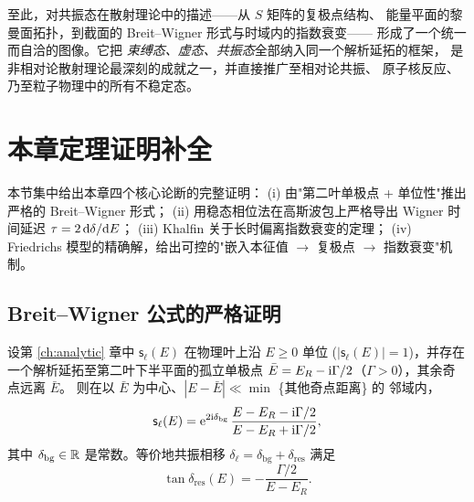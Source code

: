 至此，对共振态在散射理论中的描述——从 $S$ 矩阵的复极点结构、
能量平面的黎曼面拓扑，到截面的 Breit--Wigner 形式与时域内的指数衰变——
形成了一个统一而自洽的图像。它把
\emph{束缚态、虚态、共振态}全部纳入同一个解析延拓的框架，
是非相对论散射理论最深刻的成就之一，并直接推广至相对论共振、
原子核反应、乃至粒子物理中的所有不稳定态。

\section{本章定理证明补全}\label{sec:res-proofs}

本节集中给出本章四个核心论断的完整证明：
(i) 由"第二叶单极点 + 单位性"推出严格的 Breit--Wigner 形式；
(ii) 用稳态相位法在高斯波包上严格导出 Wigner 时间延迟
$\tau=2\,\mathrm{d}\delta/\mathrm{d} E$；
(iii) Khalfin 关于长时偏离指数衰变的定理；
(iv) Friedrichs 模型的精确解，给出可控的"嵌入本征值
$\to$ 复极点 $\to$ 指数衰变"机制。

\subsection{Breit--Wigner 公式的严格证明}\label{subsec:res-BW-proof}

\begin{theorem}\label{thm:res-BW}
  设第 \ref{ch:analytic} 章中 $\mathsf{s}_\ell(E)$ 在物理叶上沿 $E\geq 0$ 单位
  ($|\mathsf{s}_\ell(E)|=1$)，并存在一个解析延拓至第二叶下半平面的孤立单极点
  $\bar E=E_R-\mathrm{i}\Gamma/2$（$\Gamma>0$），其余奇点远离 $\bar E$。
  则在以 $\bar E$ 为中心、$|E-\bar E|\ll \min$ \{其他奇点距离\} 的
  邻域内，
  \begin{equation}\label{eq:res-BW-canonical}
    \mathsf{s}_\ell(E)=\mathrm{e}^{2\mathrm{i}\delta_{\mathrm{bg}}}\,
    \frac{E-E_R-\mathrm{i}\Gamma/2}{E-E_R+\mathrm{i}\Gamma/2},
  \end{equation}
  其中 $\delta_{\mathrm{bg}}\in\mathbb{R}$ 是常数。等价地共振相移
  $\delta_\ell=\delta_{\mathrm{bg}}+\delta_{\mathrm{res}}$ 满足
  \begin{equation}\label{eq:res-BW-tan}
    \tan\delta_{\mathrm{res}}(E)=-\frac{\Gamma/2}{E-E_R}.
  \end{equation}
\end{theorem}

